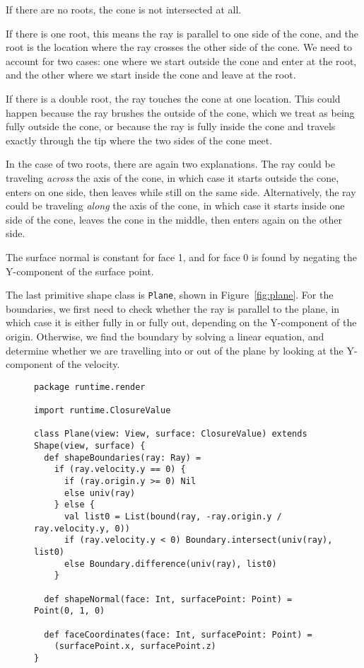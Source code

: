 If there are no roots, the cone is not intersected at all.

If there is one root, this means the ray is parallel to one side of the cone,
and the root is the location where the ray crosses
the other side of the cone.
We need to account for two cases:
one where we start outside the cone and enter at the root,
and the other where we start inside the cone and leave at the root.

If there is a double root,
the ray touches the cone at one location.
This could happen because the ray brushes the outside of the cone,
which we treat as being fully outside the cone,
or because the ray is fully inside the cone
and travels exactly through the tip where the two sides of the cone meet.

In the case of two roots, there are again two explanations.
The ray could be traveling \emph{across} the axis of the cone,
in which case it starts outside the cone,
enters on one side,
then leaves while still on the same side.
Alternatively,
the ray could be traveling \emph{along} the axis of the cone,
in which case it starts inside one side of the cone,
leaves the cone in the middle,
then enters again on the other side.

The surface normal is constant for face 1,
and for face 0 is found by negating the Y-component of the surface point.

The last primitive shape class is \verb!Plane!,
shown in Figure~\ref{fig:plane}.
For the boundaries,
we first need to check whether the ray is parallel to the plane,
in which case it is either fully in or fully out,
depending on the Y-component of the origin.
Otherwise,
we find the boundary by solving a linear equation,
and determine whether we are travelling into or out of the plane
by looking at the Y-component of the velocity.

\begin{figure}
\begin{verbatim}
package runtime.render

import runtime.ClosureValue

class Plane(view: View, surface: ClosureValue) extends Shape(view, surface) {
  def shapeBoundaries(ray: Ray) =
    if (ray.velocity.y == 0) {
      if (ray.origin.y >= 0) Nil
      else univ(ray)
    } else {
      val list0 = List(bound(ray, -ray.origin.y / ray.velocity.y, 0))
      if (ray.velocity.y < 0) Boundary.intersect(univ(ray), list0)
      else Boundary.difference(univ(ray), list0)
    }

  def shapeNormal(face: Int, surfacePoint: Point) = Point(0, 1, 0)

  def faceCoordinates(face: Int, surfacePoint: Point) =
    (surfacePoint.x, surfacePoint.z)
}
\end{verbatim}
\getcaption
\end{figure}

